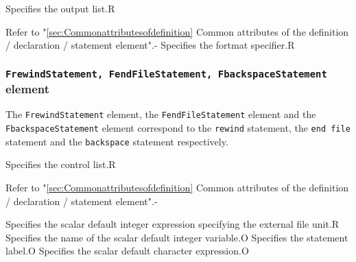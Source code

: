 
\begin{XcodeMLChildElements}
{Specifies the output list.}{R}
\end{XcodeMLChildElements}

\begin{XcodeMLAttributes}
{Refer to "\ref{sec:Commonattributesofdefinition} Common attributes of the definition / declaration / statement element".}{-}
{Specifies the fortmat specifier.}{R}
\end{XcodeMLAttributes}


\subsubsection{ {\tt FrewindStatement, FendFileStatement, FbackspaceStatement} element}

The {\tt FrewindStatement} element, the {\tt FendFileStatement} element and the {\tt FbackspaceStatement} element
correspond to the {\tt rewind} statement, the {\tt end file} statement and the {\tt backspace} statement respectively.


\begin{XcodeMLChildElements}
{Specifies the control list.}{R}
\end{XcodeMLChildElements}

\begin{XcodeMLAttributes}
{Refer to "\ref{sec:Commonattributesofdefinition} Common attributes of the definition / declaration / statement element".}{-}
\end{XcodeMLAttributes}

\begin{XcodeMLControlList}
{Specifies the scalar default integer expression specifying the external file unit.}{R}
{Specifies the name of the scalar default integer variable.}{O}
{Specifies the statement label.}{O}
{Specifies the scalar default character expression.}{O}
\end{XcodeMLControlList}



